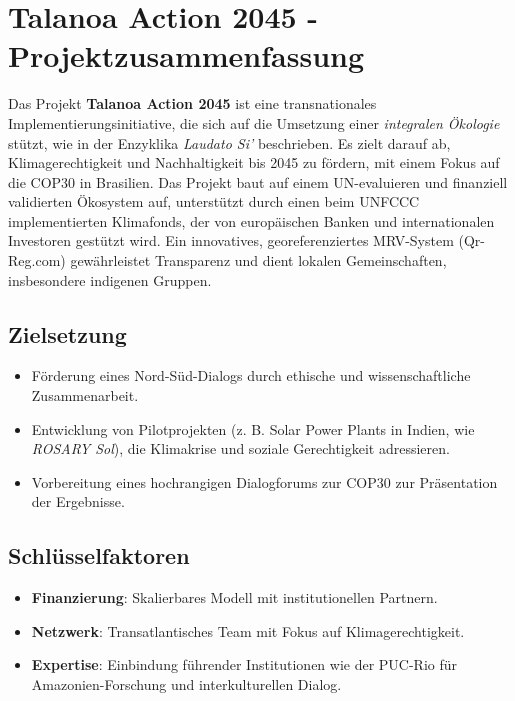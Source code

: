 \documentclass[a4paper,12pt]{article}
\begin{document}
\section*{Talanoa Action 2045 - Projektzusammenfassung}


Das Projekt \textbf{Talanoa Action 2045} ist eine transnationales Implementierungsinitiative, die sich auf die Umsetzung einer \textit{integralen Ökologie} stützt, wie in der Enzyklika \textit{Laudato Si’} beschrieben. Es zielt darauf ab, Klimagerechtigkeit und Nachhaltigkeit bis 2045 zu fördern, mit einem Fokus auf die COP30 in Brasilien. Das Projekt baut auf einem UN-evaluieren und finanziell validierten Ökosystem auf, unterstützt durch einen beim UNFCCC implementierten Klimafonds, der von europäischen Banken und internationalen Investoren gestützt wird. Ein innovatives, georeferenziertes MRV-System (Qr-Reg.com) gewährleistet Transparenz und dient lokalen Gemeinschaften, insbesondere indigenen Gruppen.

\subsection*{Zielsetzung}
\begin{itemize}
    \item Förderung eines Nord-Süd-Dialogs durch ethische und wissenschaftliche Zusammenarbeit.
    \item Entwicklung von Pilotprojekten (z. B. Solar Power Plants in Indien, wie \textit{ROSARY Sol}), die Klimakrise und soziale Gerechtigkeit adressieren.
    \item Vorbereitung eines hochrangigen Dialogforums zur COP30 zur Präsentation der Ergebnisse.
\end{itemize}

\subsection*{Schlüsselfaktoren}
\begin{itemize}
    \item \textbf{Finanzierung}: Skalierbares Modell mit institutionellen Partnern.
    \item \textbf{Netzwerk}: Transatlantisches Team mit Fokus auf Klimagerechtigkeit.
    \item \textbf{Expertise}: Einbindung führender Institutionen wie der PUC-Rio für Amazonien-Forschung und interkulturellen Dialog.
\end{itemize}
\end{document}
